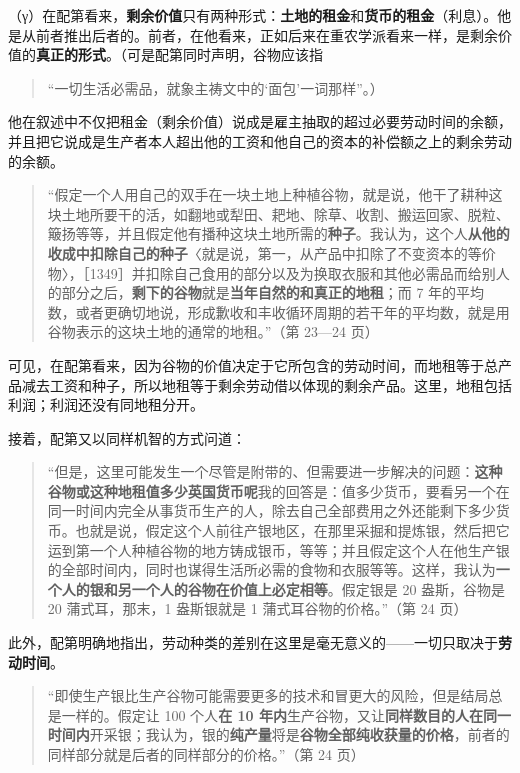 （γ）在配第看来，\textbf{剩余价值}只有两种形式：\textbf{土地的租金}和\textbf{货币的租金}（利息）。他是从前者推出后者的。前者，在他看来，正如后来在重农学派看来一样，是剩余价值的\textbf{真正的形式}。（可是配第同时声明，谷物应该指

\begin{quote}“一切生活必需品，就象主祷文中的‘面包’一词那样”。）\end{quote}

他在叙述中不仅把租金（剩余价值）说成是雇主抽取的超过必要劳动时间的余额，并且把它说成是生产者本人超出他的工资和他自己的资本的补偿额之上的剩余劳动的余额。

\begin{quote}“假定一个人用自己的双手在一块土地上种植谷物，就是说，他干了耕种这块土地所要干的活，如翻地或犁田、耙地、除草、收割、搬运回家、脱粒、簸扬等等，并且假定他有播种这块土地所需的\textbf{种子}。我认为，这个人\textbf{从他的收成中扣除自己的种子}〈就是说，第一，从产品中扣除了不变资本的等价物〉，［1349］并扣除自己食用的部分以及为换取衣服和其他必需品而给别人的部分之后，\textbf{剩下的谷物}就是\textbf{当年自然的和真正的地租}；而 7 年的平均数，或者更确切地说，形成歉收和丰收循环周期的若干年的平均数，就是用谷物表示的这块土地的通常的地租。”（第 23—24 页）\end{quote}

可见，在配第看来，因为谷物的价值决定于它所包含的劳动时间，而地租等于总产品减去工资和种子，所以地租等于剩余劳动借以体现的剩余产品。这里，地租包括利润；利润还没有同地租分开。

接着，配第又以同样机智的方式问道：

\begin{quote}“但是，这里可能发生一个尽管是附带的、但需要进一步解决的问题：\textbf{这种谷物或这种地租值多少英国货币呢}我的回答是：值多少货币，要看另一个在同一时间内完全从事货币生产的人，除去自己全部费用之外还能剩下多少货币。也就是说，假定这个人前往产银地区，在那里采掘和提炼银，然后把它运到第一个人种植谷物的地方铸成银币，等等；并且假定这个人在他生产银的全部时间内，同时也谋得生活所必需的食物和衣服等等。这样，我认为\textbf{一个人的银和另一个人的谷物在价值上必定相等}。假定银是 20 盎斯，谷物是 20 蒲式耳，那末，1 盎斯银就是 1 蒲式耳谷物的价格。”（第 24 页）\end{quote}

此外，配第明确地指出，劳动种类的差别在这里是毫无意义的——一切只取决于\textbf{劳动时间}。

\begin{quote}“即使生产银比生产谷物可能需要更多的技术和冒更大的风险，但是结局总是一样的。假定让 100 个人\textbf{在 10 年内}生产谷物，又让\textbf{同样数目的人在同一时间内}开采银；我认为，银的\textbf{纯产量}将是\textbf{谷物全部纯收获量的价格}，前者的同样部分就是后者的同样部分的价格。”（第 24 页）\end{quote}

